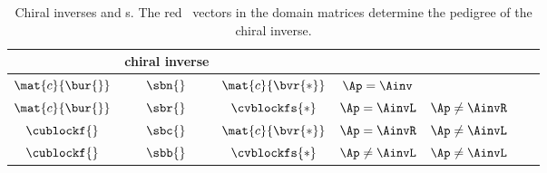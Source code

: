 \begin{table}[htdp]
\caption[Chiral inverses and \ns s]{Chiral inverses and \ns s. The red \ns \ vectors in the domain matrices determine the pedigree of the chiral inverse.}
%
\begin{center}
\begin{tabular}{ccccccc}
%
   \svdg{*}{} & chiral inverse & \\\hline
%
  $\mat{c}{\bur{}}$  &  $\sbn{}$  &  $\mat{c}{\bvr{*}}$ & $\Ap = \Ainv$ \\[5pt]
%
  $\mat{c}{\bur{}}$  &  $\sbr{}$  &  $\cvblockfs{*}$ & $\Ap = \AinvL$  &  $\Ap \ne \AinvR$ \\[5pt]
%
  $\cublockf{}$  &  $\sbc{}$  &  $\mat{c}{\bvr{*}}$ & $\Ap = \AinvR$  &  $\Ap \ne \AinvL$ \\[5pt]
%
  $\cublockf{}$  &  $\sbb{}$  &  $\cvblockfs{*}$ & $\Ap \ne \AinvL$  &  $\Ap \ne \AinvL$
%
\end{tabular}
\end{center}
\label{tab:mpp:chiral inverses:b}
\end{table}%

\endinput